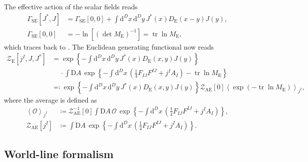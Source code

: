 \documentclass[12pt]{article}
\newcommand\dif{\mathrm{d}}
\newcommand\Dif{\mathrm{D}}
\DeclareMathOperator{\tr}{tr}
\newcommand{\rbr}[1]{{\left(#1\right)}}
\newcommand{\abr}[1]{{\left<#1\right>}}
\newcommand{\rfun}[2]{{#1}\mathopen{}\left(#2\right)\mathclose{}}
\newcommand{\sfun}[2]{{#1}\mathopen{}\left[#2\right]\mathclose{}}
\newcommand{\cfun}[2]{{#1}\mathopen{}\left\{#2\right\}\mathclose{}}
\begin{document}
The effective action of the scalar fields reads
\begin{align}
\sfun{\varGamma_{\text{SE}}}{J^*, J} &= \sfun{\varGamma_{\text{SE}}}{0,0} +
	\int\dif^D x\,\dif^D y\,
		\rfun{J^*}{x}\rfun{D_{\text{E}}}{x-y} \rfun{J}{y},
\\
\sfun{\varGamma_{\text{SE}}}{0,0} &=
	-\sfun{\ln}{\rbr{\det M_\text{E}}^{-1}} = \tr\ln M_\text{E},
\end{align}
which traces back to \cite{heisenberg1936,weisskopf1936}. The Euclidean 
generating functional now reads
\begin{align}
\sfun{\mathcal{Z}_\text{E}}{j^I, J, J^*} &=
\cfun{\exp}{- \int\dif^D x\,\dif^D y\,
	\rfun{J^*}{x}\rfun{D_\text{E}}{x,y} \rfun{J}{y}}
\nonumber \\
&\quad\,\cdot
\int\Dif A\, \cfun{\exp}{-\int \dif^D x\,
\rbr{\frac{1}{4} F_{IJ} F^{IJ} + j^{I} A_{I}} - \tr\ln M_\text{E}}
\nonumber \\
&\eqqcolon
\cfun{\exp}{- \int\dif^D x\,\dif^D y\,
	\rfun{J^*}{x}\rfun{D_\text{E}}{x,y} \rfun{J}{y}}
\sfun{\mathcal{Z}_\text{AE}}{0}
		\abr{\rfun{\exp}{-\tr\ln M_\text{E}}}_{j^I},
\label{eq:eucl-effe-100}
\end{align}
where the average is defined as
\begin{align}
\abr{\mathcal{O}}_{j^I} &\coloneqq \sfun{\mathcal{Z}_\text{AE}^{-1}}{0}
\int\Dif A\, \mathcal{O}\,\cfun{\exp}{-\int \dif^D x\,
	\rbr{\frac{1}{4} F_{IJ} F^{IJ} + j^{I} A_{I}}},
\\
\sfun{\mathcal{Z}_\text{AE}}{j^I} &\coloneqq
\int\Dif A\, \cfun{\exp}{-\int \dif^D x\,
\rbr{\frac{1}{4} F_{IJ} F^{IJ} + j^{I} A_{I}}}.
\end{align}


\subsection{World-line formalism}
\label{ssec:eucl-wlfm}
\end{document}
